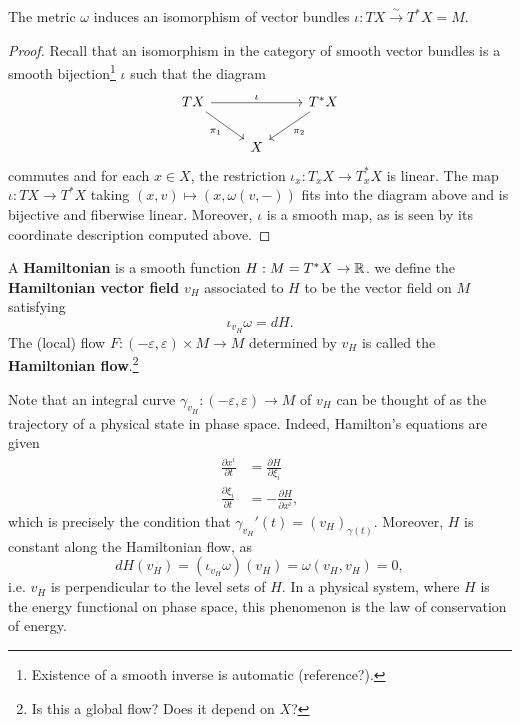 \documentclass{amsart}
\begin{document}
\begin{proposition}
    The metric $\omega$ induces an isomorphism of vector bundles $\iota:TX\xrightarrow{\sim}T^*X=M$.
\end{proposition}
\begin{proof}
    Recall that an isomorphism in the category of smooth vector bundles is a smooth
    bijection\footnote{Existence of a smooth inverse is automatic (reference?).}
    $\iota$ such that the diagram
    \begin{equation*}
        \begin{tikzcd}
            TX\ar{rr}{\iota}\ar[swap]{rd}{\pi_1} & & T^*X\ar{ld}{\pi_2}\\
            & X
        \end{tikzcd}
    \end{equation*}
    commutes and for each $x\in X$, the restriction $\iota_x:T_xX\to T^*_xX$ is linear.
    The map $\iota:TX\to T^*X$ taking $(x,v)\mapsto (x,\omega(v,-))$ fits into the diagram above
    and is bijective and fiberwise linear. Moreover, $\iota$ is a smooth map, as is seen by
    its coordinate description computed above.
\end{proof}

\begin{definition}
    A \textbf{Hamiltonian} is a smooth function $H:M=T^*X\to\mathbb{R}$.
    we define the \textbf{Hamiltonian vector field} $v_H$ associated to $H$ to be the vector
    field on $M$ satisfying
    \begin{equation*}
        \iota_{v_H}\omega = dH.
    \end{equation*}
    The (local) flow $F:(-\varepsilon,\varepsilon)\times M\to M$ determined by $v_H$ is
    called the \textbf{Hamiltonian flow}.\footnote{Is this a global flow? Does it depend on $X$?}
\end{definition}

Note that an integral curve $\gamma_{v_H}:(-\varepsilon,\varepsilon)\to M$ of $v_H$ can be thought
of as the trajectory of a physical state in phase space. Indeed, Hamilton's equations are given
\begin{align*}
    \frac{\partial x^i}{\partial t} &= \frac{\partial H}{\partial \xi_i} \\
    \frac{\partial \xi_i}{\partial t} &= - \frac{\partial H}{\partial x^i},
\end{align*}
which is precisely the condition that $\gamma_{v_H}'(t)=(v_H)_{\gamma(t)}$. Moreover, $H$ is
constant along the Hamiltonian flow, as
\begin{equation*}
    dH(v_H) = (\iota_{v_H}\omega)(v_H)=\omega(v_H,v_H) = 0,
\end{equation*}
i.e. $v_H$ is perpendicular to the level sets of $H$. In a physical system, where $H$ is the
energy functional on phase space, this phenomenon is the law of conservation of energy.
\end{document}
